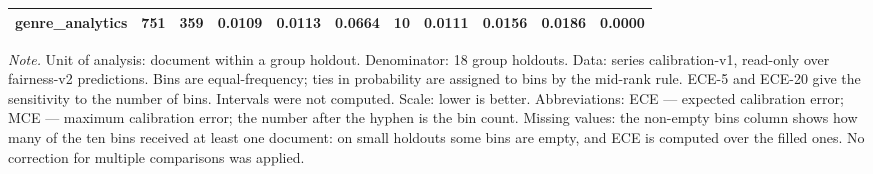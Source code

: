 \begin{table}[htbp]
\begin{tabular}{lllllllllll}
genre\_analytics & 751 & 359 & 0.0109 & 0.0113 & 0.0664 & 10 & 0.0111 & 0.0156 & 0.0186 & 0.0000 \\
\bottomrule
\end{tabular}
\begin{minipage}{\linewidth}\footnotesize\vspace{2pt}
\textit{Note.} Unit of analysis: document within a group holdout. Denominator: 18 group holdouts. Data: series calibration-v1, read-only over fairness-v2 predictions. Bins are equal-frequency; ties in probability are assigned to bins by the mid-rank rule. ECE-5 and ECE-20 give the sensitivity to the number of bins. Intervals were not computed. Scale: lower is better. Abbreviations: ECE — expected calibration error; MCE — maximum calibration error; the number after the hyphen is the bin count. Missing values: the non-empty bins column shows how many of the ten bins received at least one document: on small holdouts some bins are empty, and ECE is computed over the filled ones. No correction for multiple comparisons was applied.
\end{minipage}
\end{table}
